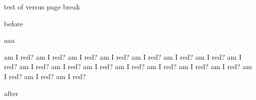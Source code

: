 \documentclass[a4paper]{article}
\begin{document}
\noindent\hrulefill test of \string\color\space versus page break\hrulefill

\vspace{18cm}

before

\begin{shaded}

aaa

\color{red}

am I red?
am I red?
am I red?
am I red?
am I red?
am I red?
am I red?
am I red?
am I red?
am I red?
am I red?
am I red?
am I red?
am I red?
am I red?
am I red?
am I red?
am I red?
\end{shaded}

after
\end{document}
